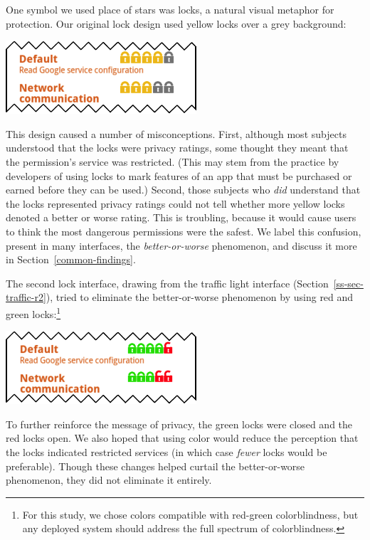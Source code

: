 \documentclass[11pt]{article}
\newcommand{\refsec}[1]{Section~\ref{#1}}
\begin{document}
One symbol we used place of stars was locks, a natural visual metaphor for protection.
Our original lock design used yellow locks over a grey background:
\label{ss-sec-locks-r1}
\begin{center}
\includegraphics[width=.5\linewidth]{candidate-img/locks/locksR1.png}
\end{center}
This design caused a number of
misconceptions.
First, although most subjects understood that the locks were privacy 
ratings, some thought they meant that 
the permission's service was restricted. (This may 
stem from the practice by developers of using locks to mark features of 
an app that must be purchased or earned before they can be used.)
Second, those subjects who \emph{did} understand that the locks represented privacy ratings
could not tell whether more yellow locks denoted a better or worse 
rating. This is troubling, because it would cause users to think the most 
dangerous permissions were the safest. We label this confusion,
present in many interfaces, the 
\emph{better-or-worse} phenomenon, and discuss it more in \refsec{common-findings}.

The second lock interface, drawing from the traffic light interface
(\refsec{ss-sec-traffic-r2}), tried to eliminate the better-or-worse 
phenomenon by using red and green locks:\footnote{For this 
  study, we chose colors
  compatible with red-green colorblindness, but any deployed system
  should address the full spectrum of colorblindness.}
\label{ss-sec-locks-r2}
\begin{center}
\includegraphics[width=.5\linewidth]{candidate-img/locks/locksR2.png}
\end{center}
To further reinforce the message of privacy, the 
green locks were closed and the red locks open.
We also hoped that using color would reduce 
the perception that the locks indicated restricted services (in which 
case \emph{fewer} locks would be preferable).
Though these changes helped curtail the better-or-worse phenomenon, they did not 
eliminate it entirely. 
\end{document}
